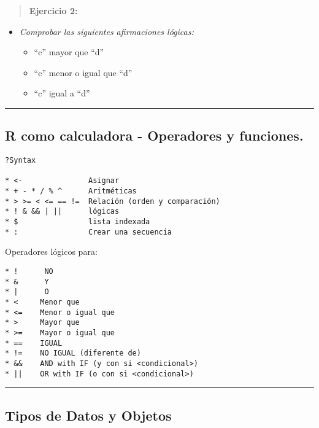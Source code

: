 \documentclass[
]{book}
\begin{document}
\begin{quote}
\textbf{Ejercicio 2:}
\end{quote}

\begin{itemize}
\item
  \emph{Comprobar las siguientes afirmaciones lógicas:}

  \begin{itemize}
  \item
    ``c'' mayor que ``d''
  \item
    ``c'' menor o igual que ``d''
  \item
    ``c'' igual a ``d''
  \end{itemize}
\end{itemize}

\begin{center}\rule{0.5\linewidth}{0.5pt}\end{center}

\hypertarget{r-como-calculadora---operadores-y-funciones.}{%
\subsection{R como calculadora - Operadores y funciones.}\label{r-como-calculadora---operadores-y-funciones.}}

\begin{verbatim}
?Syntax

* <-               Asignar
* + - * / % ^      Aritméticas
* > >= < <= == !=  Relación (orden y comparación)
* ! & && | ||      lógicas
* $                lista indexada
* :                Crear una secuencia
\end{verbatim}

Operadores lógicos para:

\begin{verbatim}
* !      NO
* &      Y
* |      O
* <     Menor que
* <=    Menor o igual que
* >     Mayor que
* >=    Mayor o igual que
* ==    IGUAL
* !=    NO IGUAL (diferente de)
* &&    AND with IF (y con si <condicional>)
* ||    OR with IF (o con si <condicional>)
\end{verbatim}

\begin{center}\rule{0.5\linewidth}{0.5pt}\end{center}

\hypertarget{tipos-de-datos-y-objetos}{%
\subsection{Tipos de Datos y Objetos}\label{tipos-de-datos-y-objetos}}
\end{document}
